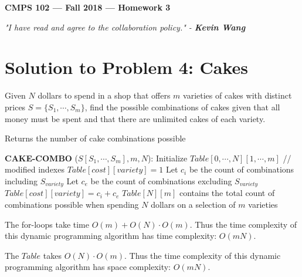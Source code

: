 \documentclass[11pt]{article}
\theoremstyle{definition}
\theoremstyle{plain}
\theoremstyle{indented-remark}
\theoremstyle{indented-proof}
\begin{document}
\begin{center}
{\bf\Large CMPS 102 --- Fall 2018 ---  Homework 3}
\end{center}

\begin{center}
\textit{"I have read and agree to the collaboration policy." - \textbf{Kevin Wang}}
\end{center}

\section*{Solution to Problem 4: Cakes}

Given $N$ dollars to spend in a shop that offers $m$ varieties of cakes with distinct prices $S = \{ S_{1} , \cdots , S_{m} \}$, find the possible combinations of cakes given that all money must be spent and that there are unlimited cakes of each variety.

\begin{algorithm}
\caption{Returns the number of cake combinations possible}
\begin{algorithmic} 
\STATE \textbf{CAKE-COMBO} ($S[S_{1} , \cdots , S_{m}], m, N$):
\STATE Initialize $Table[0,\cdots,N][1,\cdots,m]$ // modified indexes
\STATE $Table[cost][variety]=1$ 
\ENDFOR
{}
\STATE Let $c_{i}$ be the count of combinations including $S_{variety}$
\STATE Let $c_{e}$ be the count of combinations excluding $S_{variety}$
\STATE $Table[cost][variety]=c_{i}+c_{e}$
\ENDFOR
\ENDFOR
\STATE $Table[N][m]$ contains the total count of combinations possible when spending $N$ dollars on a selection of $m$ varieties
\end{algorithmic}
\end{algorithm}

\noindent The for-loops take time $O(m) + O(N) \cdot O(m)$. Thus the time complexity of this dynamic programming algorithm has time complexity: $O(mN)$. \newline

\noindent The $Table$ takes $O(N) \cdot O(m)$. Thus the time complexity of this dynamic programming algorithm has space complexity: $O(mN)$.
\end{document}
